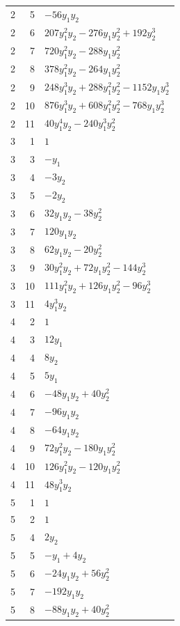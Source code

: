 \documentclass[10pt,a4paper]{article}
\begin{document}
{\begin{longtable}{rrp{125mm}}
2 & 5 & $- 56 y_{1} y_{2}$\\
2 & 6 & $207 y_{1}^{2} y_{2} - 276 y_{1} y_{2}^{2} + 192 y_{2}^{3}$\\
2 & 7 & $720 y_{1}^{2} y_{2} - 288 y_{1} y_{2}^{2}$\\
2 & 8 & $378 y_{1}^{2} y_{2} - 264 y_{1} y_{2}^{2}$\\
2 & 9 & $248 y_{1}^{3} y_{2} + 288 y_{1}^{2} y_{2}^{2} - 1152 y_{1} y_{2}^{3}$\\
2 & 10 & $876 y_{1}^{3} y_{2} + 608 y_{1}^{2} y_{2}^{2} - 768 y_{1} y_{2}^{3}$\\
2 & 11 & $40 y_{1}^{4} y_{2} - 240 y_{1}^{3} y_{2}^{2}$\\
3 & 1 & $1$\\
3 & 3 & $- y_{1}$\\
3 & 4 & $- 3 y_{2}$\\
3 & 5 & $- 2 y_{2}$\\
3 & 6 & $32 y_{1} y_{2} - 38 y_{2}^{2}$\\
3 & 7 & $120 y_{1} y_{2}$\\
3 & 8 & $62 y_{1} y_{2} - 20 y_{2}^{2}$\\
3 & 9 & $30 y_{1}^{2} y_{2} + 72 y_{1} y_{2}^{2} - 144 y_{2}^{3}$\\
3 & 10 & $111 y_{1}^{2} y_{2} + 126 y_{1} y_{2}^{2} - 96 y_{2}^{3}$\\
3 & 11 & $4 y_{1}^{3} y_{2}$\\
4 & 2 & $1$\\
4 & 3 & $12 y_{1}$\\
4 & 4 & $8 y_{2}$\\
4 & 5 & $5 y_{1}$\\
4 & 6 & $- 48 y_{1} y_{2} + 40 y_{2}^{2}$\\
4 & 7 & $- 96 y_{1} y_{2}$\\
4 & 8 & $- 64 y_{1} y_{2}$\\
4 & 9 & $72 y_{1}^{2} y_{2} - 180 y_{1} y_{2}^{2}$\\
4 & 10 & $126 y_{1}^{2} y_{2} - 120 y_{1} y_{2}^{2}$\\
4 & 11 & $48 y_{1}^{3} y_{2}$\\
5 & 1 & $1$\\
5 & 2 & $1$\\
5 & 4 & $2 y_{2}$\\
5 & 5 & $- y_{1} + 4 y_{2}$\\
5 & 6 & $- 24 y_{1} y_{2} + 56 y_{2}^{2}$\\
5 & 7 & $- 192 y_{1} y_{2}$\\
5 & 8 & $- 88 y_{1} y_{2} + 40 y_{2}^{2}$\\

\end{longtable}}
\end{document}
